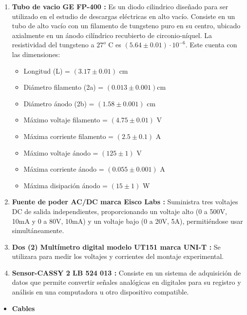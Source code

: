 \documentclass[%
 reprint,
 amsmath,amssymb,
 aps,
]{revtex4-2}
\begin{document}
\begin{enumerate}[label=\textbf{\arabic*.}]
    \item \textbf{Tubo de vacio GE FP-400 \cite{fp400}:} Es un diodo cilindrico diseñado para ser utilizado en el estudio de descargas eléctricas en alto vacío. Consiste en un tubo de alto vacío con un filamento de tungsteno puro en su centro, ubicado axialmente en un ánodo cilíndrico recubierto de circonio-níquel. La resistividad del tungsteno a $27^{o}$ C es $(5.64 \pm 0.01)\cdot 10^{-6}$. Este cuenta con las dimensiones:

    \begin{itemize}
        \item Longitud (L) = $(3.17 \pm 0.01)$ cm
       \item  Diámetro filamento (2a) = $(0.013 \pm 0.001)\text{cm}$
        \item Diámetro ánodo (2b) = $(1.58 \pm 0.001)$ cm
        \item Máximo voltaje filamento = $(4.75 \pm 0.01)$ V
        \item Máxima corriente filamento = $(2.5 \pm 0.1)$ A
        \item Máximo voltaje ánodo = $(125 \pm 1)$ V
        \item Máxima corriente ánodo = $(0.055 \pm 0.001)$ A
        \item Máxima disipación ánodo = $(15 \pm 1)$ W
    \end{itemize}

    \item \textbf{Fuente de poder AC/DC marca Eisco Labs \cite{eisco}:} Suministra tres voltajes DC de salida independientes, proporcionando un voltaje alto (0 a 500V, 10mA y 0 a 80V, 10mA) y un voltaje bajo (0 a 20V, 5A), permitiéndose usar simultáneamente.

    \item \textbf{Dos (2) Multímetro digital modelo UT151 marca UNI-T \cite{unit}:} Se utilizara para medir los voltajes y corrientes del montaje experimental.

    \item \textbf{Sensor-CASSY 2 LB 524 013 \cite{sensorcassy}:} Consiste en un sistema de adquisición de datos que permite convertir señales analógicas en digitales para su registro y análisis en una computadora u otro dispositivo compatible.
\end{enumerate}
\begin{itemize}
    \item \textbf{Cables}
\end{itemize}
\end{document}
